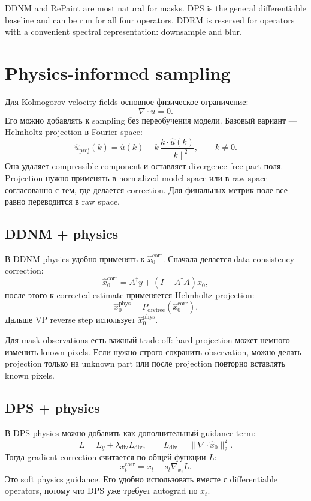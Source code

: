 \documentclass[10pt]{article}
\newcommand{\norm}[1]{\lVert#1\rVert}
\begin{document}
DDNM and RePaint are most natural for masks. DPS is the general differentiable
baseline and can be run for all four operators. DDRM is reserved for operators with
a convenient spectral representation: downsample and blur.

\section{Physics-informed sampling}

Для Kolmogorov velocity fields основное физическое ограничение:
\[
    \nabla\cdot u = 0.
\]
Его можно добавлять к sampling без переобучения модели. Базовый вариант --- Helmholtz
projection в Fourier space:
\[
    \hat u_{\mathrm{proj}}(k)
    =
    \hat u(k)
    -
    k\,\frac{k\cdot \hat u(k)}{\norm{k}^2},
    \qquad k\ne0.
\]
Она удаляет compressible component и оставляет divergence-free part поля. Projection
нужно применять в normalized model space или в raw space согласованно с тем, где делается
correction. Для финальных метрик поле все равно переводится в raw space.

\subsection{DDNM + physics}

В DDNM physics удобно применять к \(\hat x_0^{\mathrm{corr}}\). Сначала делается
data-consistency correction:
\[
    \hat x_0^{\mathrm{corr}}
    =
    A^\dagger y + (I-A^\dagger A)\hat x_0,
\]
после этого к corrected estimate применяется Helmholtz projection:
\[
    \hat x_0^{\mathrm{phys}} = P_{\mathrm{divfree}}(\hat x_0^{\mathrm{corr}}).
\]
Дальше VP reverse step использует \(\hat x_0^{\mathrm{phys}}\).

Для mask observations есть важный trade-off: hard projection может немного изменить known
pixels. Если нужно строго сохранить observation, можно делать projection только на unknown
part или после projection повторно вставлять known pixels.

\subsection{DPS + physics}

В DPS physics можно добавить как дополнительный guidance term:
\[
    L = L_y + \lambda_{\mathrm{div}} L_{\mathrm{div}},
    \qquad
    L_{\mathrm{div}} = \norm{\nabla\cdot \hat x_0}_2^2.
\]
Тогда gradient correction считается по общей функции \(L\):
\[
    x_t^{\mathrm{corr}}
    =
    x_t - s_t \nabla_{x_t}L.
\]
Это soft physics guidance. Его удобно использовать вместе с differentiable operators,
потому что DPS уже требует autograd по \(x_t\).
\end{document}
